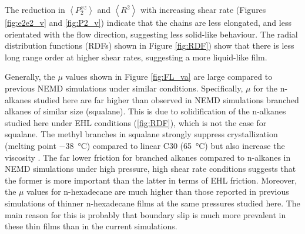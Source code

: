 \documentclass[aps,prb,reprint,superscriptaddress, a4paper]{revtex4-1}
\begin{document}
The reduction in $\left<P_{2}^{xz} \right> $ and $\left< R^2 \right>$ with increasing shear rate (Figures \ref{fig:e2e2_v} and \ref{fig:P2_v}) indicate that the chains are less elongated, and less orientated with the flow direction, suggesting less solid-like behaviour. The radial distribution functions (RDFs) shown in Figure \ref{fig:RDF}) show that there is less long range order at higher shear rates, suggesting a more liquid-like film.

Generally, the $\mu$ values shown in Figure \ref{fig:FL_va} are large compared to previous NEMD simulations under similar conditions. Specifically, $\mu$ for the n-alkanes studied here are far higher than observed in NEMD simulations branched alkanes of similar size (squalane)\cite{Ewen2017a}. This is due to solidification of the n-alkanes studied here under EHL conditions (\ref{fig:RDF}), which is not the case for squalane. The methyl branches in squalane strongly suppress crystallization (melting point \SI{-38}{\celsius}) compared to linear C30 (\SI{65}{\celsius}) but also increase the viscosity \cite{Jabbarzadeh2002}. The far lower friction for branched alkanes compared to n-alkanes in NEMD simulations under high pressure, high shear rate conditions suggests that the former is more important than the latter in terms of EHL friction. Moreover, the $\mu$ values for n-hexadecane are much higher than those reported in previous simulations of thinner n-hexadecane films at the same pressures studied here\cite{Ta2017}. The main reason for this is probably that boundary slip is much more prevalent in these thin films than in the current simulations.
\end{document}
